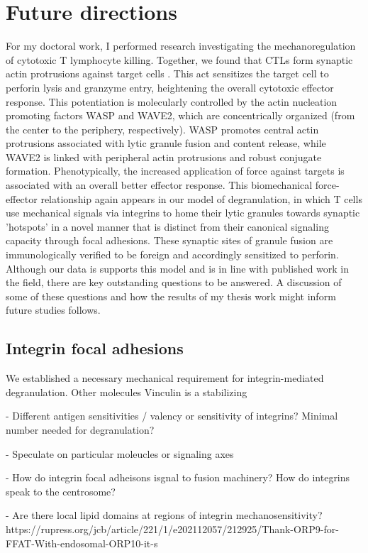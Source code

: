 \section{Future directions} 

For my doctoral work, I performed research investigating the mechanoregulation of cytotoxic T lymphocyte killing. Together, we found that CTLs form synaptic actin protrusions against target cells \cite{Tamzalit2018}. This act sensitizes the target cell to perforin lysis and granzyme entry, heightening the overall cytotoxic effector response. This potentiation is molecularly controlled by the actin nucleation promoting factors WASP and WAVE2, which are concentrically organized (from the center to the periphery, respectively). WASP promotes central actin protrusions associated with lytic granule fusion and content release, while WAVE2 is linked with peripheral actin protrusions and robust conjugate formation. Phenotypically, the increased application of force against targets is associated with an overall better effector response. This biomechanical force-effector relationship again appears in our model of degranulation, in which T cells use mechanical signals via integrins to home their lytic granules towards synaptic 'hotspots' in a novel manner that is distinct from their canonical signaling capacity through focal adhesions. These synaptic sites of granule fusion are immunologically verified to be foreign and accordingly sensitized to perforin. Although our data is supports this model and is in line with published work in the field, there are key outstanding questions to be answered. A discussion of some of these questions and how the results of my thesis work might inform future studies follows.

\subsection{Integrin focal adhesions}
We established a necessary mechanical requirement for integrin-mediated degranulation. Other molecules Vinculin is a stabilizing 

- Different antigen sensitivities / valency or sensitivity of integrins? Minimal number needed for degranulation?

- Speculate on particular moleucles or signaling axes

- How do integrin focal adheisons isgnal to fusion machinery? How do integrins speak to the centrosome?

- Are there local lipid domains at regions of integrin mechanosensitivity? https://rupress.org/jcb/article/221/1/e202112057/212925/Thank-ORP9-for-FFAT-With-endosomal-ORP10-it-s

